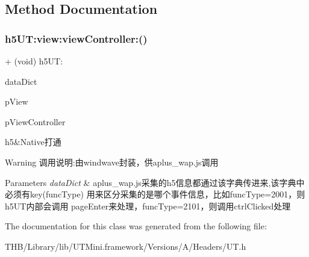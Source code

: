 \subsection{Method Documentation}
\mbox{\label{interface_u_t_aa3f1931237de122a88454feb4605c8ce}} 
\subsubsection{\texorpdfstring{h5\+U\+T\+:view\+:view\+Controller\+:()}{h5UT:view:viewController:()}}
{\footnotesize\ttfamily + (void) h5\+U\+T\+: \begin{DoxyParamCaption}\item[{(N\+S\+Dictionary $\ast$)}]{data\+Dict }\item[{view:(U\+I\+Web\+View $\ast$)}]{p\+View }\item[{viewController:(U\+I\+View\+Controller $\ast$)}]{p\+View\+Controller }\end{DoxyParamCaption}}



h5\&Native打通 

\begin{DoxyWarning}{Warning}
调用说明\+:由windwave封装，供aplus\+\_\+wap.\+js调用
\end{DoxyWarning}

\begin{DoxyParams}{Parameters}
{\em data\+Dict} & aplus\+\_\+wap.\+js采集的h5信息都通过该字典传进来,该字典中必须有key(func\+Type) 用来区分采集的是哪个事件信息，比如func\+Type=2001，则h5\+U\+T内部会调用 page\+Enter来处理，func\+Type=2101，则调用ctrl\+Clicked处理 \\
\hline
\end{DoxyParams}


The documentation for this class was generated from the following file\+:\begin{DoxyCompactItemize}
\item 
T\+H\+B/\+Library/lib/\+U\+T\+Mini.\+framework/\+Versions/\+A/\+Headers/U\+T.\+h\end{DoxyCompactItemize}
